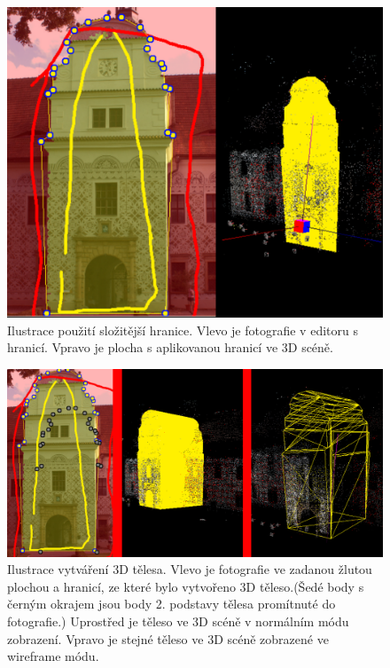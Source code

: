 \documentclass[11pt,twoside,a4paper]{book}
\begin{document}
\begin{figure}[]
	\begin{center}
		\includegraphics[width=15cm]{ilustrace/program/P-6}
		\caption{Ilustrace použití složitější hranice. Vlevo je fotografie v editoru s hranicí. Vpravo je plocha s aplikovanou hranicí ve 3D scéně.}
		\label{fig:P-6}
	\end{center}
\end{figure}

\begin{figure}[]
	\begin{center}
		\includegraphics[width=15cm]{ilustrace/program/P-7}
		\caption{Ilustrace vytváření 3D tělesa. Vlevo je fotografie ve zadanou žlutou plochou a hranicí, ze které bylo vytvořeno 3D těleso.(Šedé body s černým okrajem jsou body 2. podstavy tělesa promítnuté do fotografie.) Uprostřed je těleso ve 3D scéně v normálním módu zobrazení. Vpravo je stejné těleso ve 3D scéně zobrazené ve wireframe módu. }
		\label{fig:P-7}
	\end{center}
\end{figure}
\end{document}
